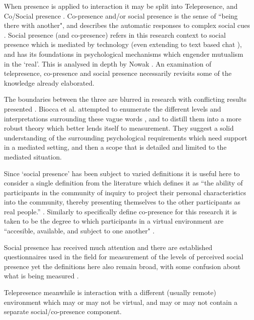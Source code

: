When presence is applied to interaction it may be split into Telepresence, and Co/Social presence  \cite{Heeter1992, Biocca1997}.  Co-presence and/or social presence is the sense of ``being there with another", and describes the automatic responses to complex social cues \cite{Fulk1987, Haythornthwaite1995}.    Social presence (and co-presence) refers in this research context to social presence which is mediated by technology (even extending to text based chat \cite{Gunawardena1997}), and has its foundations in psychological mechanisms which engender mutualism in the `real'. This is analysed in depth by Nowak \cite{Nowak2001}. An examination of telepresence, co-presence and social presence necessarily revisits some of the knowledge already elaborated.\par
        The boundaries between the three are blurred in research with conflicting results presented \cite{Bulu2012}. Biocca et al. attempted to enumerate the different levels and interpretations surrounding these vague words \cite{Biocca2003}, and to distill them into a more robust theory which better lends itself to measurement. They suggest a solid understanding of the surrounding psychological requirements which need support in a mediated setting, and then a scope that is detailed and limited to the mediated situation.\par
 Since `social presence' has been subject to varied definitions \cite{Biocca2003} it is useful here to consider a single definition from the literature which defines it as ``the ability of participants in the community of inquiry to project their personal characteristics into the community, thereby presenting themselves to the other participants as real people.'' \cite{Garrison1999, Beck2011}. Similarly to specifically define co-presence for this research it is taken to be the degree to which participants in a virtual environment are ``accesible, available, and subject to one another" \cite{Biocca2003}. \par
            Social presence has received much attention and there are established questionnaires used in the field for measurement of the levels of perceived social presence yet the definitions here also remain broad, with some confusion about what is being measured \cite{Biocca2003}.\par            
 Telepresence meanwhile is interaction with a different (usually remote) environment which may or may not be virtual, and may or may not contain a separate social/co-presence component. \par 
